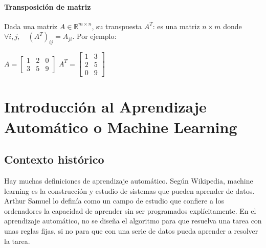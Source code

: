 \paragraph{Transposición de matriz} Dada una matriz $A \in \mathbb{R}^{m \times n}$, su transpuesta $A^T$: es una matriz $n \times m$ donde $\forall i, j, \quad (A^T)_{ij} = A_{ji}$. Por ejemplo:
\begin{table}[h]
\centering
$A = \begin{bmatrix}
1 & 2 & 0 \\ 3 & 5 & 9
\end{bmatrix}$
\qquad \qquad \qquad
$A^T = \begin{bmatrix}
1 & 3 \\ 2 & 5 \\ 0 & 9
\end{bmatrix} $
\end{table}

\section{Introducción al Aprendizaje Automático o Machine Learning}
\subsection{Contexto histórico}
Hay muchas definiciones de aprendizaje automático. Según Wikipedia, machine learning es la construcción y estudio de sistemas que pueden aprender de datos. Arthur Samuel lo definía como un campo de estudio que confiere a los ordenadores la capacidad de aprender sin ser programados explícitamente. En el aprendizaje automático, no se diseña el algoritmo para que resuelva una tarea con unas reglas fijas, si no para que con una serie de datos pueda aprender a resolver la tarea. 

